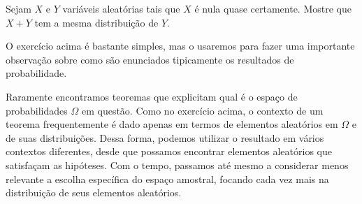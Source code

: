 \documentclass[../main/Notas_de_aula.tex]{subfiles}
\begin{document}
\begin{exercise}
  Sejam $X$ e $Y$ variáveis aleatórias tais que $X$ é nula quase certamente.
  Mostre que $X + Y$ tem a mesma distribuição de $Y$.
\end{exercise}

O exercício acima é bastante simples, mas o usaremos para fazer uma importante observação sobre como são enunciados tipicamente os resultados de probabilidade.

Raramente encontramos teoremas que explicitam qual é o espaço de probabilidades $\Omega$ em questão.
Como no exercício acima, o contexto de um teorema frequentemente é dado apenas em termos de elementos aleatórios em $\Omega$ e de suas distribuições.
Dessa forma, podemos utilizar o resultado em vários contextos diferentes, desde que possamos encontrar elementos aleatórios que satisfaçam as hipóteses.
Com o tempo, passamos até mesmo a considerar menos relevante a escolha específica do espaço amostral, focando cada vez mais na distribuição de seus elementos aleatórios.
\end{document}
